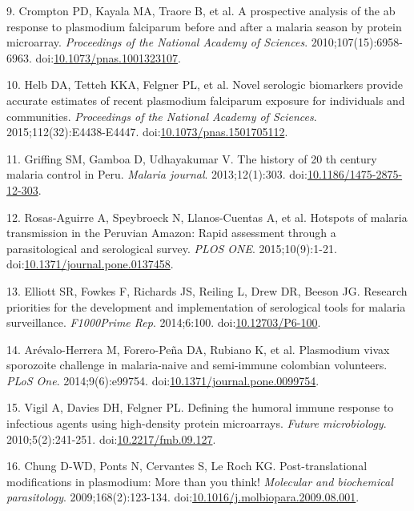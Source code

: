 \documentclass[]{article}
\begin{document}
\hypertarget{ref-crompton2010}{}
9. Crompton PD, Kayala MA, Traore B, et al. A prospective analysis of
the ab response to plasmodium falciparum before and after a malaria
season by protein microarray. \emph{Proceedings of the National Academy
of Sciences}. 2010;107(15):6958-6963.
doi:\href{https://doi.org/10.1073/pnas.1001323107}{10.1073/pnas.1001323107}.

\hypertarget{ref-Helb2015exposure}{}
10. Helb DA, Tetteh KKA, Felgner PL, et al. Novel serologic biomarkers
provide accurate estimates of recent plasmodium falciparum exposure for
individuals and communities. \emph{Proceedings of the National Academy
of Sciences}. 2015;112(32):E4438-E4447.
doi:\href{https://doi.org/10.1073/pnas.1501705112}{10.1073/pnas.1501705112}.

\hypertarget{ref-griffing2013history}{}
11. Griffing SM, Gamboa D, Udhayakumar V. The history of 20 th century
malaria control in Peru. \emph{Malaria journal}. 2013;12(1):303.
doi:\href{https://doi.org/10.1186/1475-2875-12-303}{10.1186/1475-2875-12-303}.

\hypertarget{ref-hotspots2015}{}
12. Rosas-Aguirre A, Speybroeck N, Llanos-Cuentas A, et al. Hotspots of
malaria transmission in the Peruvian Amazon: Rapid assessment through a
parasitological and serological survey. \emph{PLOS ONE}.
2015;10(9):1-21.
doi:\href{https://doi.org/10.1371/journal.pone.0137458}{10.1371/journal.pone.0137458}.

\hypertarget{ref-elliott2014}{}
13. Elliott SR, Fowkes F, Richards JS, Reiling L, Drew DR, Beeson JG.
Research priorities for the development and implementation of
serological tools for malaria surveillance. \emph{F1000Prime Rep}.
2014;6:100. doi:\href{https://doi.org/10.12703/P6-100}{10.12703/P6-100}.

\hypertarget{ref-arevalo2014}{}
14. Arévalo-Herrera M, Forero-Peña DA, Rubiano K, et al. Plasmodium
vivax sporozoite challenge in malaria-naive and semi-immune colombian
volunteers. \emph{PLoS One}. 2014;9(6):e99754.
doi:\href{https://doi.org/10.1371/journal.pone.0099754}{10.1371/journal.pone.0099754}.

\hypertarget{ref-vigil2010}{}
15. Vigil A, Davies DH, Felgner PL. Defining the humoral immune response
to infectious agents using high-density protein microarrays.
\emph{Future microbiology}. 2010;5(2):241-251.
doi:\href{https://doi.org/10.2217/fmb.09.127}{10.2217/fmb.09.127}.

\hypertarget{ref-leroch2009postmod}{}
16. Chung D-WD, Ponts N, Cervantes S, Le Roch KG. Post-translational
modifications in plasmodium: More than you think! \emph{Molecular and
biochemical parasitology}. 2009;168(2):123-134.
doi:\href{https://doi.org/10.1016/j.molbiopara.2009.08.001}{10.1016/j.molbiopara.2009.08.001}.
\end{document}
